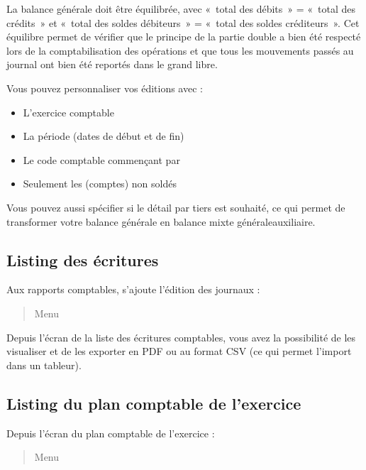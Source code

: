 \documentclass[a4paper,10pt,oneside,french]{sphinxmanual}
\begin{document}
La balance générale doit être équilibrée, avec « total des débits » = « total des crédits » et « total des soldes débiteurs » = « total des soldes créditeurs ». Cet équilibre permet de vérifier que le principe de la partie double a bien été respecté lors de la comptabilisation des opérations et que tous les mouvements passés au journal ont bien été reportés dans le grand libre.

Vous pouvez personnaliser vos éditions avec :
\begin{itemize}
\item {} 
L’exercice comptable

\item {} 
La période (dates de début et de fin)

\item {} 
Le code comptable commençant par

\item {} 
Seulement les (comptes) non soldés

\end{itemize}

Vous pouvez aussi spécifier si le détail par tiers est souhaité, ce qui permet de transformer votre balance générale en balance mixte générale\sphinxhyphen{}auxiliaire.


\subsection{Listing des écritures}
\label{\detokenize{accounting/reporting:listing-des-ecritures}}
Aux rapports comptables, s’ajoute l’édition des journaux :
\begin{quote}

Menu 
\end{quote}

Depuis l’écran de la liste des écritures comptables, vous avez la possibilité de les visualiser et de les exporter en PDF ou  au format CSV (ce qui permet l’import dans un tableur).


\subsection{Listing du plan comptable de l’exercice}
\label{\detokenize{accounting/reporting:listing-du-plan-comptable-de-l-exercice}}
Depuis l’écran du plan comptable de l’exercice :
\begin{quote}

Menu 
\end{quote}
\end{document}
